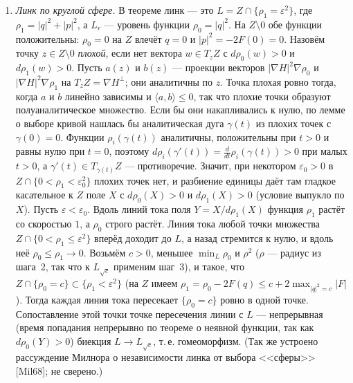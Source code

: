 \documentclass[11pt,a4paper]{article}
\theoremstyle{definition}
\newcommand{\eps}{\varepsilon}
\begin{document}
\begin{enumerate}[leftmargin=*,label=\arabic*.]
\item \emph{Линк по круглой сфере.} В теореме линк --- это $L=Z\cap\{\rho_1=\eps^2\}$, где
$\rho_1=|q|^2+|p|^2$, а $L_r$ --- уровень функции $\rho_0=|q|^2$. На $Z\setminus0$ обе функции
положительны: $\rho_0=0$ на $Z$ влечёт $q=0$ и $|p|^2=-2F(0)=0$. Назовём точку $z\in Z\setminus0$
\emph{плохой}, если нет вектора $w\in T_zZ$ с $d\rho_0(w)>0$ и $d\rho_1(w)>0$. Пусть $a(z)$ и $b(z)$ ---
проекции векторов $|\nabla H|^2\nabla\rho_0$ и $|\nabla H|^2\nabla\rho_1$ на $T_zZ=\nabla H^\perp$; они аналитичны
по $z$. Точка плохая ровно тогда, когда $a$ и $b$ линейно зависимы и $\langle a,b\rangle\le0$, так что
плохие точки образуют полуаналитическое множество. Если бы они накапливались к нулю, по лемме о
выборе кривой нашлась бы аналитическая дуга $\gamma(t)$ из плохих точек с $\gamma(0)=0$. Функции
$\rho_i(\gamma(t))$ аналитичны, положительны при $t>0$ и равны нулю при $t=0$, поэтому
$d\rho_i(\gamma'(t))=\frac{d}{dt}\rho_i(\gamma(t))>0$ при малых $t>0$, а $\gamma'(t)\in T_{\gamma(t)}Z$ ---
противоречие. Значит, при некотором $\eps_0>0$ в $Z\cap\{0<\rho_1<\eps_0^2\}$ плохих точек нет, и
разбиение единицы даёт там гладкое касательное к $Z$ поле $X$ с $d\rho_0(X)>0$ и $d\rho_1(X)>0$
(условие выпукло по $X$). Пусть $\eps<\eps_0$. Вдоль линий тока поля $Y=X/d\rho_1(X)$ функция $\rho_1$
растёт со скоростью $1$, а $\rho_0$ строго растёт. Линия тока любой точки множества
$Z\cap\{0<\rho_1\le\eps^2\}$ вперёд доходит до $L$, а назад стремится к нулю, и вдоль неё
$\rho_0\le\rho_1\to0$. Возьмём $c>0$, меньшее $\min_L\rho_0$ и $\rho^2$ ($\rho$ --- радиус из шага~2, так что к $L_{\sqrt c}$
применим шаг~3), и такое, что
$Z\cap\{\rho_0=c\}\subset\{\rho_1<\eps^2\}$ (на $Z$ имеем $\rho_1=\rho_0-2F(q)\le c+2\max_{|q|^2=c}|F|$).
Тогда каждая линия тока пересекает $\{\rho_0=c\}$ ровно в одной точке. Сопоставление этой точки
точке пересечения линии с $L$ --- непрерывная (время попадания непрерывно по теореме о неявной
функции, так как $d\rho_0(Y)>0$) биекция $L\to L_{\sqrt c}$, т.\,е. гомеоморфизм. (Так же устроено
рассуждение Милнора о независимости линка от выбора <<сферы>> [Mil68]; не сверено.)


\end{enumerate}
\end{document}
